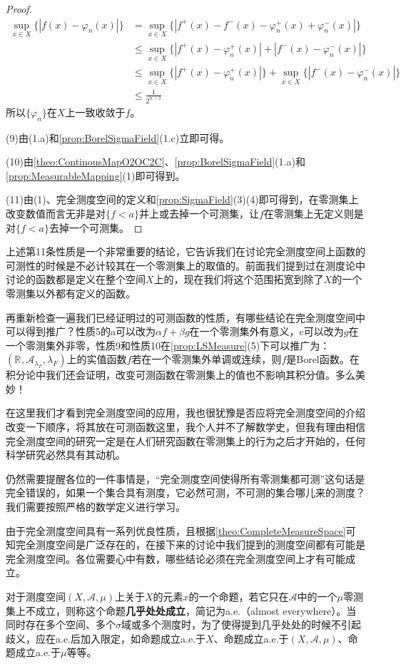 \begin{proof}
	\begin{align*}
		\sup_{x\in X}\{|f(x)-\varphi_n(x)|\}
		&=\sup_{x\in X}\{|f^+(x)-f^-(x)-\varphi_n^+(x)+\varphi_n^-(x)|\} \\
		&\leqslant\sup_{x\in X}\{|f^+(x)-\varphi_n^+(x)|+|f^-(x)-\varphi_n^-(x)|\} \\
		&\leqslant\sup_{x\in X}\{|f^+(x)-\varphi_n^+(x)|\}+\sup_{x\in X}\{|f^-(x)-\varphi_n^-(x)|\} \\
		&\leqslant\frac{1}{2^{n-1}}
	\end{align*}
	所以$\{\varphi_n\}$在$X$上一致收敛于$f$。\par
	(9)由(1.a)和\cref{prop:BorelSigmaField}(1.c)立即可得。\par
	(10)由\cref{theo:ContinousMapO2OC2C}、\cref{prop:BorelSigmaField}(1.a)和\cref{prop:MeasurableMapping}(1)即可得到。\par
	(11)由(1)、完全测度空间的定义和\cref{prop:SigmaField}(3)(4)即可得到，在零测集上改变数值而言无非是对$\{f<a\}$并上或去掉一个可测集，让$f$在零测集上无定义则是对$\{f<a\}$去掉一个可测集。
\end{proof}
\begin{note}
	上述第11条性质是一个非常重要的结论，它告诉我们在讨论完全测度空间上函数的可测性的时候是不必计较其在一个零测集上的取值的。前面我们提到过在测度论中讨论的函数都是定义在整个空间$X$上的，现在我们将这个范围拓宽到除了$X$的一个零测集以外都有定义的函数。\par
	再重新检查一遍我们已经证明过的可测函数的性质，有哪些结论在完全测度空间中可以得到推广？性质5的a可以改为$\alpha f+\beta g$在一个零测集外有意义，c可以改为$g$在一个零测集外非零，性质9和性质10在\cref{prop:LSMeasure}(5)下可以推广为：$(\mathbb{R}^{},\mathscr{A}_{\lambda_F},\lambda_F)$上的实值函数$f$若在一个零测集外单调或连续，则$f$是Borel函数。在积分论中我们还会证明，改变可测函数在零测集上的值也不影响其积分值。多么美妙！\par
	在这里我们才看到完全测度空间的应用，我也很犹豫是否应将完全测度空间的介绍改变一下顺序，将其放在可测函数这里，我个人并不了解数学史，但我有理由相信完全测度空间的研究一定是在人们研究函数在零测集上的行为之后才开始的，任何科学研究必然具有其动机。\par
	仍然需要提醒各位的一件事情是，“完全测度空间使得所有零测集都可测”这句话是完全错误的，如果一个集合具有测度，它必然可测，不可测的集合哪儿来的测度？我们需要按照严格的数学定义进行学习。\par
	由于完全测度空间具有一系列优良性质，且根据\cref{theo:CompleteMeasureSpace}可知完全测度空间是广泛存在的，在接下来的讨论中我们提到的测度空间都有可能是完全测度空间。各位需要心中有数，哪些结论必须在完全测度空间上才有可能成立。
\end{note}
\begin{definition}
	对于测度空间$(X,\mathscr{A},\mu)$上关于$X$的元素$x$的一个命题，若它只在$\mathscr{A}$中的一个$\mu$零测集上不成立，则称这个命题\textbf{几乎处处成立}，简记为a.e.（almost everywhere）。当同时存在多个空间、多个$\sigma$域或多个测度时，为了使得提到几乎处处的时候不引起歧义，应在a.e.后加入限定，如命题成立a.e.于$X$、命题成立a.e.于$(X,\mathscr{A},\mu)$、命题成立a.e.于$\mu$等等。
\end{definition}

